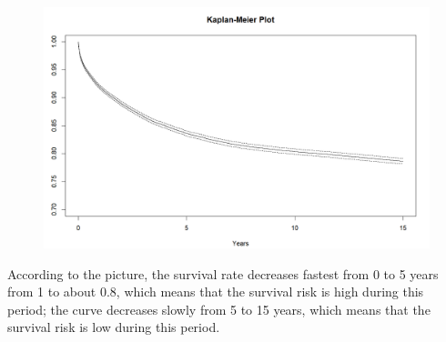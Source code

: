 \documentclass[12pt,letterpaper]{article}
\begin{document}
 
\begin{figure}[ht]
	\centering
	\includegraphics[width=1\textwidth]{picture1.png}  
\end{figure}
According to the picture, the survival rate decreases fastest from 0 to 5 years from 1 to about 0.8, which means that the survival risk is high during this period; the curve decreases slowly from 5 to 15 years, which means that the survival risk is low during this period.
\pagebreak
\end{document}
